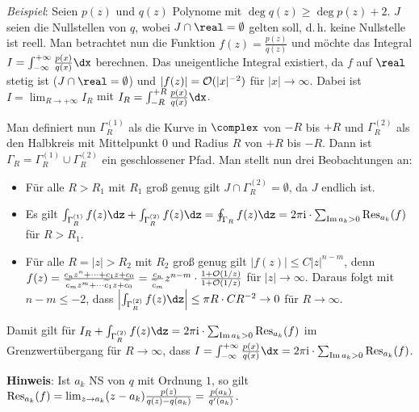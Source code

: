 \linie

\emph{Beispiel}:
Seien $p(z)$ und $q(z)$ Polynome mit $\deg q(z) \ge \deg p(z) + 2$.
$J$ seien die Nullstellen von $q$, wobei $J \cap \real = \emptyset$ gelten
soll, d.\,h. keine Nullstelle ist reell.
Man betrachtet nun die Funktion $f(z) = \frac{p(z)}{q(z)}$ und möchte
das Integral $I = \int_{-\infty}^{+\infty} \frac{p(x)}{q(x)} \dx$ berechnen.
Das uneigentliche Integral existiert, da $f$ auf $\real$ stetig ist
($J \cap \real = \emptyset$) und $|f(z)| = \mathcal{O}(|x|^{-2})$ für $|x| \to \infty$.
Dabei ist $I = \lim_{R \to +\infty} I_R$ mit
$I_R = \int_{-R}^{+R} \frac{p(x)}{q(x)} \dx$.

Man definiert nun $\Gamma_R^{(1)}$ als die Kurve in $\complex$
von $-R$ bis $+R$ und $\Gamma_R^{(2)}$ als den Halbkreis mit Mittelpunkt $0$
und Radius $R$ von $+R$ bis $-R$.
Dann ist $\Gamma_R = \Gamma_R^{(1)} \cup \Gamma_R^{(2)}$ ein
geschlossener Pfad.
Man stellt nun drei Beobachtungen an:
\begin{itemize}
    \item
    Für alle $R > R_1$ mit $R_1$ groß genug gilt
    $J \cap \Gamma_R^{(2)} = \emptyset$, da $J$ endlich ist.
    
    \item
    Es gilt $\int_{\Gamma_R^{(1)}} f(z)\dz + \int_{\Gamma_R^{(2)}} f(z)\dz =
    \oint_{\Gamma_R} f(z)\dz = 2\pi\i \cdot \sum_{\Im a_k > 0} \Res_{a_k}(f)$
    für $R > R_1$.
    
    \item
    Für alle $R = |z| > R_2$ mit $R_2$ groß genug gilt
    $|f(z)| \le C |z|^{n-m}$, denn\\
    $f(z) = \frac{c_n z^n + \dotsb + c_1 z + c_0}
    {\widetilde{c}_m z^m + \dotsb \widetilde{c}_1 z + \widetilde{c}_0} =
    \frac{c_n}{\widetilde{c}_m} z^{n-m} \cdot \frac{1 + \mathcal{O}(1/z)}{1 + \mathcal{O}(1/z)}$
    für $|z| \to \infty$.
    Daraus folgt mit $n - m \le -2$, dass
    $\left|\int_{\Gamma_R^{(2)}} f(z)\dz\right| \le \pi R \cdot CR^{-2} \to 0$
    für $R \to \infty$.
\end{itemize}

Damit gilt für $I_R + \int_{\Gamma_R^{(2)}} f(z)\dz =
2\pi\i \cdot \sum_{\Im a_k > 0} \Res_{a_k}(f)$ im Grenzwertübergang für
$R \to \infty$, dass
$I = \int_{-\infty}^{+\infty} \frac{p(x)}{q(x)} \dx =
2\pi\i \cdot \sum_{\Im a_k > 0} \Res_{a_k}(f)$.

\linie

\textbf{Hinweis}:
Ist $a_k$ NS von $q$ mit Ordnung $1$, so gilt
$\operatorname{Res}_{a_k}(f) = \lim_{z \to a_k} (z - a_k) \frac{p(z)}{q(z) - q(a_k)} =
\frac{p(a_k)}{q'(a_k)}$.

